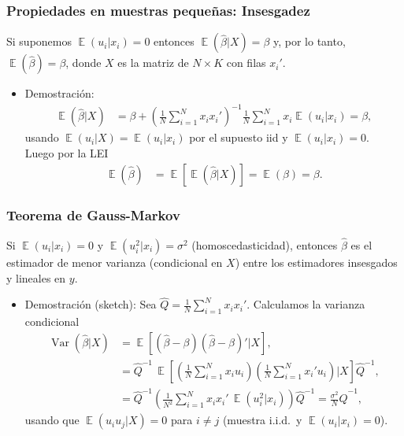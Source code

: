 \documentclass[t, compress, spanish, aspectratio=169]{beamer}
\DeclareMathOperator{\Var}{Var}
\DeclareMathOperator{\E}{\mathbb{E}}
\begin{document}
	\begin{frame}
		\frametitle{Propiedades en muestras peque\~nas: Insesgadez}
		Si suponemos $\E(u_i|x_i)=0$ entonces $\E(\hat \beta|X)=\beta$ y, por lo tanto, $\E(\hat \beta)=\beta$, donde $X$ es la matriz de $N \times K$ con filas $x_i'$.
		\begin{itemize}
			\item Demostraci\'on:
			\begin{align*}
				\E(\hat \beta |X) &= \beta +  \left( \frac{1}{N}\sum_{i=1}^{N}x_ix_i'\right)^{-1} \frac{1}{N}\sum_{i=1}^{N}x_i\E(u_i|x_i)= \beta,
			\end{align*}
			usando $\E(u_i|X)=\E(u_i|x_i)$ por el supuesto iid y $\E(u_i|x_i)=0$.\\
			Luego por la LEI
			\begin{align*}
				\E(\hat \beta) & = \E[\E(\hat \beta |X)] =\E(\beta)=\beta.
			\end{align*}
		\end{itemize}
	\end{frame}
	
	\begin{frame}
			\frametitle{Teorema de Gauss-Markov}
			Si $\E(u_i|x_i)=0$ y $\E(u_i^2|x_i)=\sigma^2$ (homoscedasticidad), entonces $\hat \beta$ es el estimador de menor varianza (condicional en $X$) entre los estimadores insesgados y lineales en $y$.
			\begin{itemize}
				\item <2-> Demostraci\'on (sketch): Sea $\hat Q=\frac{1}{N}\sum_{i=1}^{N}x_ix_i'$. Calculamos la varianza condicional
				\small
				\begin{align*}
					\Var(\hat \beta|X) &= \E[(\hat \beta-\beta)(\hat \beta-\beta)'|X],\\
					&= \hat Q^{-1}\,\E\left[\left( \frac{1}{N}\sum_{i=1}^{N}x_iu_i\right)\left( \frac{1}{N}\sum_{i=1}^{N}x_i'u_i\right)|X\right]\hat Q^{-1},\\
					&= \hat Q^{-1}\left( \frac{1}{N^2}\sum_{i=1}^{N}x_ix_i'\,\E(u_i^2|x_i)\right)\hat Q^{-1}
					= \frac{\sigma^2}{N}\hat Q^{-1},
				\end{align*}
				usando que $\E(u_iu_j|X)=0$ para $i\neq j$ (muestra i.i.d.\ y $\E(u_i|x_i)=0$).
			\end{itemize}
		\end{frame}
	
\end{document}
